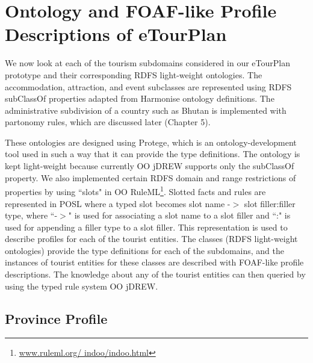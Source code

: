 \section{Ontology and FOAF-like Profile Descriptions of eTourPlan}

We now look at each of the tourism subdomains considered in our eTourPlan prototype and their corresponding RDFS light-weight ontologies. The accommodation, attraction, and event subclasses are represented using RDFS subClassOf properties adapted from Harmonise ontology definitions. The administrative subdivision of a country such as Bhutan is implemented with partonomy rules, which are discussed later (Chapter 5). 
 
\hspace{0.3in} These ontologies are designed using Protege, which is an ontology-development tool used in such a way that it can provide the type definitions. The ontology is kept light-weight because currently OO jDREW supports only the subClassOf property. We also implemented certain RDFS domain and range restrictions of properties by using ``slots" in 
OO RuleML\footnote{\href{www.ruleml.org/ indoo/indoo.html}{\url{www.ruleml.org/ indoo/indoo.html}}}. Slotted facts and rules are represented in POSL where a typed slot becomes slot name -$>$ slot filler:filler type, where ``-$>$" is used for associating a slot name to a slot filler and ``:" is used for appending a filler type to a slot filler. This representation is used to describe profiles for each of the tourist entities. The classes (RDFS light-weight ontologies) provide the type definitions for each of the subdomains, and the instances of tourist entities for these classes are described with FOAF-like profile descriptions. The knowledge about any of the tourist entities can then queried by using the typed rule system OO jDREW.

\subsection{Province Profile}

